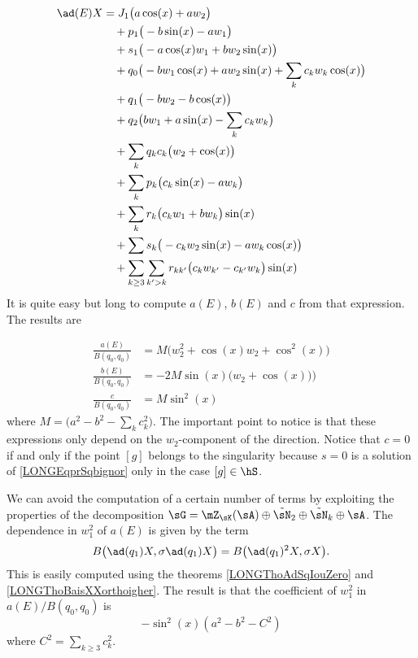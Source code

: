 \begin{equation}
    \begin{aligned}[]
        \ad(E)X    & = J_1\big( a\cos(x)+aw_2 \big)\\
            &\quad +  p_1\big( -b\sin(x)-aw_1 \big)\\
            &\quad+  s_1\big( -a\cos(x)w_1+bw_2\sin(x) \big)\\
            &\quad  +  q_0\big( -bw_1\cos(x)+aw_2\sin(x)+\sum_{k}c_kw_k\cos(x) \big)\\
            &\quad +  q_1\big( -bw_2-b\cos(x) \big)\\
            &\quad +  q_2\big( bw_1+a\sin(x)-\sum_kc_kw_k \big)\\
            &\quad +  \sum_kq_kc_k\big( w_2+\cos(x) \big)\\
            &\quad +  \sum_kp_k\big( c_k\sin(x)-aw_k \big)\\
            &\quad +  \sum_k r_k\big( c_kw_1+bw_k \big)\sin(x)\\
            &\quad +  \sum s_k\big( -c_kw_2\sin(x)-aw_k\cos(x) \big)\\
            &\quad + \sum_{k\geq 3}\sum_{k'>k} r_{kk'}\big( c_kw_{k'}-c_{k'}w_k \big)\sin(x)
    \end{aligned}
\end{equation}
It is quite easy but long to compute $a(E)$, $b(E)$ and $c$ from that expression. The results are
%

\begin{subequations}\label{LONGEqCoefsabcBE}
    \begin{align}
        \frac{ a(E) }{ B(q_0,q_0) }&=M\Big( w_2^2+\cos(x)w_2+\cos^2(x)\Big)       \label{LONGEqCoeffaE}\\
        \frac{ b(E) }{ B(q_0,q_0) }&=-2M\sin(x)\big( w_2+\cos(x)\big))\\
        \frac{ c }{ B(q_0,q_0) }&=M\sin^2(x)
    \end{align}
\end{subequations}
where $M=\big( a^2-b^2-\sum_kc_k^2 \big)$. The important point to notice is that these expressions only depend on the $w_2$-component of the direction. Notice that $c=0$ if and only if the point $[g]$ belongs to the singularity because $s=0$ is a solution of \eqref{LONGEqprSqbignor} only in the case $[g]\in\hS$.

%
We can avoid the computation of a certain number of terms by exploiting the properties of the decomposition $\sG=\mZ_{\sK}(\sA)\oplus\tilde\sN_2\oplus\tilde\sN_k\oplus\sA$. The dependence in $w_1^2$ of $a(E)$ is given by the term
\begin{equation}
    B\big( \ad(q_1)X,\sigma\ad(q_1)X \big)=B\big( \ad(q_1)^2X,\sigma X \big).
\end{equation}
This is easily computed using the theorems \ref{LONGThoAdSqIouZero} and \ref{LONGThoBaisXXorthoigher}. The result is that the coefficient of $w_1^2$ in $a(E)/B(q_0,q_0)$ is
\begin{equation}
    -\sin^2(x)(a^2-b^2- C^2)
\end{equation}
where $C^2=\sum_{k\geq 3}c_k^2$.

